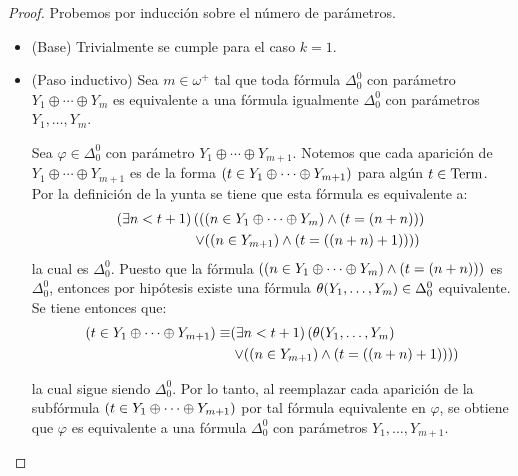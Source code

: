 \begin{proof}
	Probemos por inducción sobre el número de parámetros.

	\begin{itemize}
		\item (Base) Trivialmente se cumple para el caso $k = 1$.
		\item (Paso inductivo) Sea $m\in\omega^{+}$ tal que toda fórmula $\Delta_{0}^{0}$ con parámetro $Y_{1}\oplus\dotsb\oplus Y_{m}$ es equivalente a una fórmula igualmente $\Delta_{0}^{0}$ con parámetros $Y_{1},\dotsc, Y_{m}$.

		Sea $\varphi\in\Delta_{0}^{0}$ con parámetro $Y_{1}\oplus\dotsb\oplus Y_{m + 1}$. Notemos que cada aparición de $Y_{1}\oplus\dotsb\oplus Y_{m + 1}$ es de la forma $\pa*{t\in Y_{1}\oplus\dotsb\oplus Y_{m + 1}}$ para algún $t\in\TERMINOS$. Por la definición de la yunta se tiene que esta fórmula es equivalente a:
		\begin{align*}
			\pa*{\exists n < t + 1}&\left(\pa*{\pa*{n\in Y_{1}\oplus\dotsb\oplus Y_{m}}\land\pa*{t =\pa*{n + n}}}\right.\\
			&\left.\vee\pa*{\pa*{n\in Y_{m + 1}}\land\pa*{t =\pa*{\pa*{n + n} + 1}}}\right)
		\end{align*}
		la cual es $\Delta_{0}^{0}$. Puesto que la fórmula $\pa*{\pa*{n\in Y_{1}\oplus\dotsb\oplus Y_{m}}\land\pa*{t =\pa*{n + n}}}$ es $\Delta_{0}^{0}$, entonces por hipótesis existe una fórmula $\theta\pa*{Y_{1},\dotsc,Y_{m}}\in\Delta_{0}^{0}$ equivalente. Se tiene entonces que:
		\begin{align*}
			\pa*{t\in Y_{1}\oplus\dotsb\oplus Y_{m + 1}}\equiv&\pa*{\exists n < t + 1}\left(\theta\pa*{Y_{1},\dotsc,Y_{m}}\right.\\
			&\left.\vee\pa*{\pa*{n\in Y_{m + 1}}\land\pa*{t =\pa*{\pa*{n + n} + 1}}}\right)
		\end{align*}

		la cual sigue siendo $\Delta_{0}^{0}$. Por lo tanto, al reemplazar cada aparición de la subfórmula $\pa*{t\in Y_{1}\oplus\dotsb\oplus Y_{m + 1}}$ por tal fórmula equivalente en $\varphi$, se obtiene que $\varphi$ es equivalente a una fórmula $\Delta_{0}^{0}$ con parámetros $Y_{1},\dotsc, Y_{m + 1}$.
	\end{itemize}
\end{proof}


